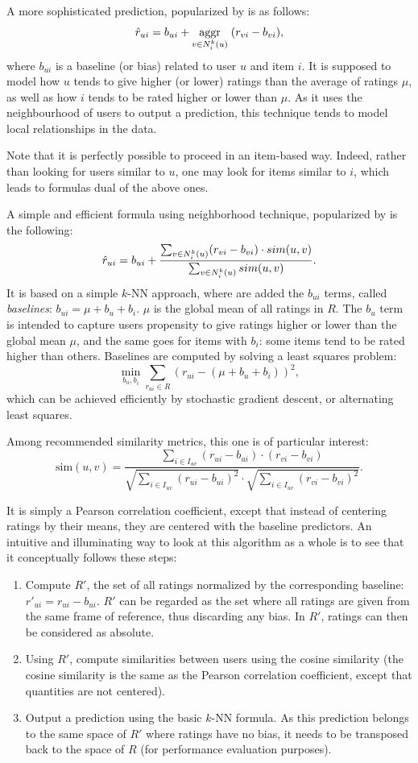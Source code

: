 A more sophisticated prediction, popularized by \cite{BelKorSIGKDD2007} is as
follows:
$$\hat{r}_{ui} = b_{ui} + \underset{v \in N_i^k(u)}{\operatorname{aggr}}\;(r_{vi} - b_{vi}),$$
where $b_{ui}$ is a baseline (or bias) related to user $u$ and item $i$. It
is supposed to model how $u$ tends to give higher (or lower) ratings than the
average of ratings $\mu$, as well as how $i$ tends to be rated higher or lower
than $\mu$. As it uses the neighbourhood of users to output a prediction, this
technique tends to model local relationships in the data.

Note that it is perfectly possible to proceed in an item-based way. Indeed,
rather than looking for users similar to $u$, one may look for items similar to
$i$, which leads to formulas dual of the above ones.


A simple and efficient formula using neighborhood technique, popularized by
\cite{KorACM2010} is the following:
$$\hat{r}_{ui} = b_{ui} + \frac{\sum_{v \in N_i^k(u)} (r_{vi} - b_{vi}) \cdot
sim(u, v)} {\sum_{v \in N_i^k(u)}sim(u, v)}.$$
It is based on a simple $k$-NN approach, where are added the $b_{ui}$ terms,
called \textit{baselines}: $b_{ui} = \mu + b_u + b_i$. $\mu$ is the global mean
of all ratings in $R$. The $b_u$ term is intended to capture users propensity
to give ratings higher or lower than the global mean $\mu$, and the same goes
for items with $b_i$: some items tend to be rated higher than others. Baselines
are computed by solving a least squares problem:
$$ \min\limits_{b_u, b_i} \sum_{r_{ui} \in R} (r_{ui} - (\mu + b_u + b_i))^2,$$
which can be achieved efficiently by stochastic gradient descent, or
alternating least squares.

Among recommended similarity metrics, this one is of particular interest:
$$\text{sim}(u, v) = \frac
{ \sum\limits_{i \in I_{uv}} (r_{ui} -  b_{ui}) \cdot (r_{vi} - b_{vi})}
{\sqrt{\sum\limits_{i \in I_{uv}} (r_{ui} -  b_{ui})^2} \cdot
\sqrt{\sum\limits_{i \in I_{uv}} (r_{vi} -  b_{vi})^2}}.$$

It is simply a Pearson correlation coefficient, except that instead of
centering ratings by their means, they are centered with the baseline
predictors. An intuitive and illuminating way to look at this algorithm as a
whole is to see that it conceptually follows these steps:
\begin{enumerate}
  \item Compute $R'$, the set of all ratings normalized by the corresponding
    baseline: $r'_{ui} = r_{ui} - b_{ui}$.  $R'$ can be regarded as the set
    where all ratings are given from the same frame of reference, thus
    discarding any bias.  In $R'$, ratings can then be considered as absolute.
  \item Using $R'$, compute similarities between users using the cosine similarity (the
    cosine similarity is the same as the Pearson correlation coefficient,
    except that quantities are not centered).
  \item Output a prediction using the basic $k$-NN formula. As this prediction
    belongs to the same space of $R'$ where ratings have no bias, it needs to
    be transposed back to the space of $R$ (for performance evaluation
    purposes).
\end{enumerate}

